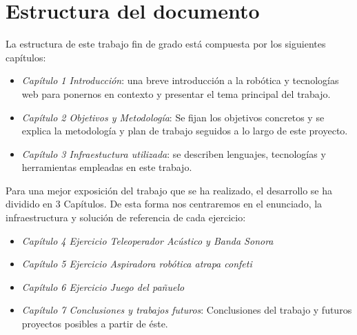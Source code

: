 \newpage
\section{Estructura del documento}

La estructura de este trabajo fin de grado está compuesta por los siguientes capítulos:

\begin{itemize}
    \item \textit{Capítulo 1 Introducción}: una breve introducción a la robótica y tecnologías web para ponernos en contexto y presentar el tema principal del trabajo.
    \item \textit{Capítulo 2 Objetivos y Metodología}: Se fijan los objetivos concretos y se explica la metodología y plan de trabajo seguidos a lo largo de este proyecto.
    \item \textit{Capítulo 3 Infraestuctura utilizada}: se describen lenguajes, tecnologías y herramientas empleadas en este trabajo.
\end{itemize}

Para una mejor exposición del trabajo que se ha realizado, el desarrollo se ha dividido en 3 Capítulos. De esta forma nos centraremos en el enunciado, la infraestructura y solución de referencia de cada ejercicio:
    
\begin{itemize}
   \item \textit{Capítulo 4 Ejercicio Teleoperador Acústico y Banda Sonora}
    \item \textit{Capítulo 5 Ejercicio Aspiradora robótica atrapa confeti}
    
    \item \textit{Capítulo 6 Ejercicio Juego del pañuelo}

    
    \item \textit{Capítulo 7 Conclusiones y trabajos futuros}: Conclusiones del trabajo y futuros proyectos posibles a partir de éste.
  \end{itemize}
